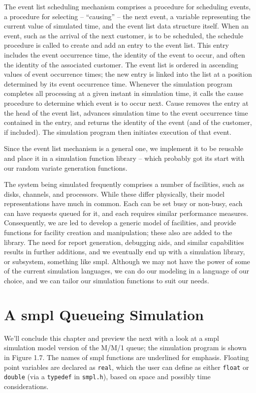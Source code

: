 The event list scheduling mechanism comprises a procedure for scheduling events,
a procedure for selecting -- ``causing'' -- the next event, a variable
representing the current value of simulated time, and the event list data
structure itself. When an event, such as the arrival of the next customer, is to
be scheduled, the schedule procedure is called to create and add an entry to the
event list. This entry includes the event occurrence time, the identity of the
event to occur, and often the identity of the associated customer. The event list
is ordered in ascending values of event occurrence times; the new entry is linked
into the list at a position determined by its event occurrence time. Whenever the
simulation program completes all processing at a given instant in simulation
time, it calls the cause procedure to determine which event is to occur next.
Cause removes the entry at the head of the event list, advances simulation time
to the event occurrence time contained in the entry, and returns the identity of
the event (and of the customer, if included). The simulation program then
initiates execution of that event.

Since the event list mechanism is a general one, we implement it to be reusable
and place it in a simulation function library -- which probably got its start
with our random variate generation functions.

The system being simulated frequently comprises a number of facilities, such as
disks, channels, and processors. While these differ physically, their model
representations have much in common. Each can be set busy or non-busy, each can
have requests queued for it, and each requires similar performance measures.
Consequently, we are led to develop a generic model of facilities, and provide
functions for facility creation and manipulation; these also are added to the
library. The need for report generation, debugging aids, and similar capabilities
results in further additions, and we eventually end up with a simulation library,
or subsystem, something like smpl. Although we may not have the power of some of
the current simulation languages, we can do our modeling in a language of our
choice, and we can tailor our simulation functions to suit our needs.

\section{A smpl Queueing Simulation}
\label{sec:smpl-queueing-simulation}
We'll conclude this chapter and preview the next with a look at a smpl
simulation model version of the M/M/1 queue; the simulation program is shown in
Figure 1.7. The names of smpl functions are underlined for emphasis. Floating
point variables are declared as \texttt{real}, which the user can define as
either \texttt{float} or \texttt{double} (via a \texttt{typedef} in \texttt{smpl.h}),
based on space and possibly time considerations.

